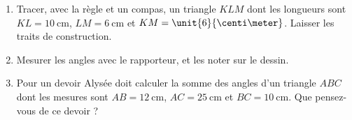 
\begin{exercice}\label{exosmath-0823}

    \begin{enumerate}
        \item
            Tracer, avec la règle et un compas, un triangle \( KLM\) dont les longueurs sont \( KL=\SI{10}{\centi\meter}\), \( LM=\SI{6}{\centi\meter}\) et \( KM=\unit{6}{\centi\meter}\). Laisser les traits de construction.
        \item
            Mesurer les angles avec le rapporteur, et les noter sur le dessin.
        \item
            Pour un devoir Alysée doit calculer la somme des angles d'un triangle \( ABC\) dont les mesures sont \( AB=\SI{12}{\centi\meter}\), \( AC=\SI{25}{\centi\meter}\) et \( BC=\SI{10}{\centi\meter}\). Que pensez-vous de ce devoir ?
    \end{enumerate}

\end{exercice}
